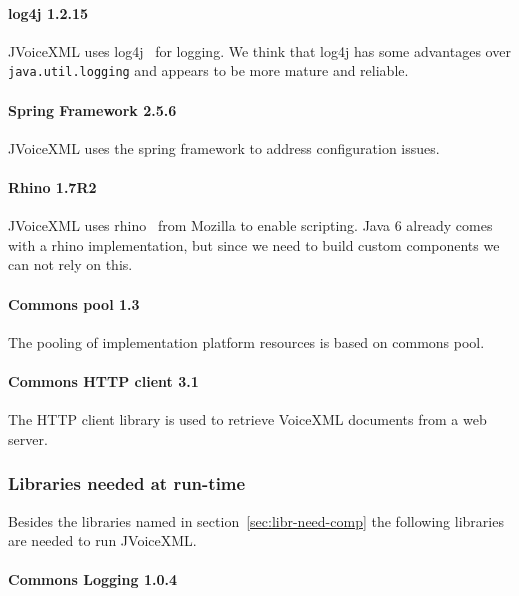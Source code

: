 \documentclass[11pt,a4paper]{article}
\begin{document}
\paragraph{log4j 1.2.15}

JVoiceXML uses log4j~\cite{apache:log4j} for logging. We think that log4j has 
some advantages
over \texttt{java.util.logging} and appears to be more mature and reliable.

\paragraph{Spring Framework 2.5.6}
\label{sec:spring-framework}

JVoiceXML uses the spring framework to address configuration issues.

\paragraph{Rhino 1.7R2}

JVoiceXML uses rhino~\cite{rhino} from Mozilla to enable scripting.
Java 6 already comes with a rhino implementation, but since we need to
build custom components we can not rely on this.

\paragraph{Commons pool 1.3}

The pooling of implementation platform resources is based on commons
pool.

\paragraph{Commons HTTP client 3.1}

The HTTP client library is used to retrieve VoiceXML documents from a web
server.

\subsubsection{Libraries needed at run-time}

Besides the libraries named in section~\ref{sec:libr-need-comp} the following
libraries are needed to run JVoiceXML.

\paragraph{Commons Logging 1.0.4}
\label{sec:commons-logging}
\end{document}

